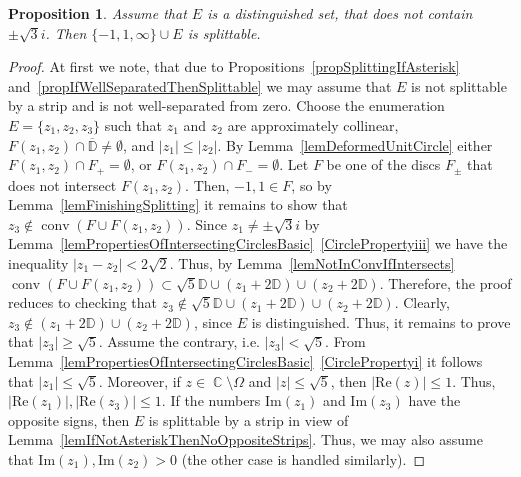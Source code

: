 \documentclass{amsart}
\numberwithin{equation}{section}
\newtheorem{proposition}[theorem]{Proposition}
\theoremstyle{definition}
\theoremstyle{remark}
\DeclareMathOperator{\conv}{conv}
\DeclareMathOperator{\CC}{\mathbb C}
\begin{document}
	\begin{proposition}\label{propIfNotSqrt3ThenSplittable}
		Assume that $E$ is a distinguished set, that does not contain $\pm \sqrt{3}i$. Then $\{-1, 1, \infty\} \cup E$ is splittable.
	\end{proposition}
	\begin{proof}
		At first we note, that due to Propositions~\ref{propSplittingIfAsterisk} and~\ref{propIfWellSeparatedThenSplittable} we may assume that $E$ is not splittable by a strip and is not well-separated from zero. Choose the enumeration $E = \{z_1,z_2,z_3\}$ such that $z_1$ and $z_2$ are approximately collinear, $F(z_1, z_2) \cap \overline{\mathbb D} \ne \emptyset$, and $|z_1| \le |z_2|$. By Lemma~\ref{lemDeformedUnitCircle} either $F(z_1,z_2) \cap F_+ = \emptyset$, or $F(z_1,z_2) \cap F_- = \emptyset$. Let $F$ be one of the discs $F_{\pm}$ that does not intersect $F(z_1,z_2)$. Then, $-1,1 \in F$, so by Lemma~\ref{lemFinishingSplitting} it remains to show that $z_3 \notin \conv(F \cup F(z_1,z_2))$. Since $z_1 \ne \pm \sqrt{3}i$ by Lemma~\ref{lemPropertiesOfIntersectingCirclesBasic}~\ref{CirclePropertyiii} we have the inequality $|z_1 - z_2| < 2\sqrt{2}$. Thus, by Lemma~\ref{lemNotInConvIfIntersects} $ \conv(F \cup F(z_1,z_2)) \subset \sqrt{5}\mathbb D \cup (z_1 + 2\mathbb D) \cup (z_2 + 2\mathbb D)$. Therefore, the proof reduces to checking that $z_3 \notin \sqrt{5}\mathbb D \cup (z_1 + 2\mathbb D) \cup (z_2 + 2\mathbb D)$. Clearly, $z_3 \notin (z_1 + 2\mathbb D) \cup (z_2 + 2\mathbb D)$, since $E$ is distinguished. Thus, it remains to prove that $|z_3| \ge \sqrt{5}$. Assume the contrary, i.e. $|z_3| < \sqrt{5}$. From Lemma~\ref{lemPropertiesOfIntersectingCirclesBasic}~\ref{CirclePropertyi} it follows that $|z_1| \le \sqrt{5}$. Moreover, if $z \in \CC \setminus \Omega$ and $|z| \le \sqrt{5}$, then $|\mathrm{Re}(z)| \le 1$. Thus, $|\mathrm{Re}(z_1)|, |\mathrm{Re}(z_3)| \le 1$. If the numbers $\mathrm{Im}(z_1)$ and $\mathrm{Im}(z_3)$ have the opposite signs, then $E$ is splittable by a strip in view of Lemma~\ref{lemIfNotAsteriskThenNoOppositeStrips}. Thus, we may also assume that $\mathrm{Im}(z_1), \mathrm{Im}(z_2) > 0$ (the other case is handled similarly).
		

\end{proof}
\end{document}
